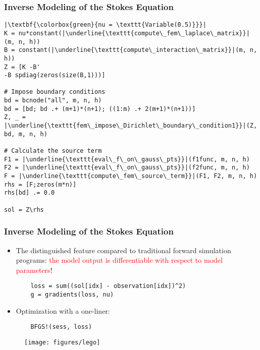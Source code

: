\documentclass[usenames,dvipsnames]{beamer}
\begin{document}
\begin{frame}[fragile]{}
	\frametitle{Inverse Modeling of the Stokes Equation}
	
	\begin{verbatim}
|\textbf{\colorbox{green}{nu = \texttt{Variable(0.5)}}}|
K = nu*constant(|\underline{\texttt{compute\_fem\_laplace\_matrix}}|(m, n, h))
B = constant(|\underline{\texttt{compute\_interaction\_matrix}}|(m, n, h))
Z = [K -B'
-B spdiag(zeros(size(B,1)))]

# Impose boundary conditions
bd = bcnode("all", m, n, h)
bd = [bd; bd .+ (m+1)*(n+1); ((1:m) .+ 2(m+1)*(n+1))]
Z, _ = |\underline{\texttt{fem\_impose\_Dirichlet\_boundary\_condition1}}|(Z, bd, m, n, h)

# Calculate the source term 
F1 = |\underline{\texttt{eval\_f\_on\_gauss\_pts}}|(f1func, m, n, h)
F2 = |\underline{\texttt{eval\_f\_on\_gauss\_pts}}|(f2func, m, n, h)
F = |\underline{\texttt{compute\_fem\_source\_term}}|(F1, F2, m, n, h)
rhs = [F;zeros(m*n)]
rhs[bd] .= 0.0

sol = Z\rhs 
	\end{verbatim}
	
	
\end{frame}



\begin{frame}[fragile]{}
	\frametitle{Inverse Modeling of the Stokes Equation}
	
	\begin{itemize}
		\item The distinguished feature compared to traditional forward simulation programs: \textcolor{red}{the model output is differentiable with respect to model parameters}!
		\begin{verbatim}
	loss = sum((sol[idx] - observation[idx])^2)
	g = gradients(loss, nu)
		\end{verbatim}
		\item Optimization with a one-liner:
		\begin{verbatim}
	BFGS!(sess, loss)
		\end{verbatim}	 
	\end{itemize}
	
	\begin{figure}[hbt]
		\centering
		\texttt{[image: figures/lego]}
	\end{figure}
	
\end{frame}
\end{document}
